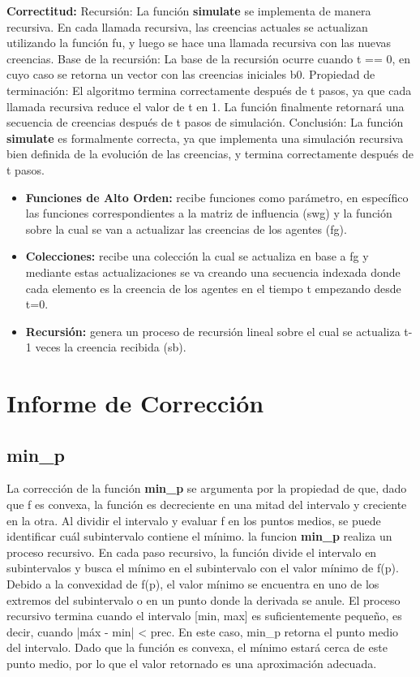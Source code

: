 \documentclass{article}
\begin{document}
    \textbf{Correctitud:}
    Recursión: La función \textbf{simulate} se implementa de manera recursiva. En cada llamada recursiva, las creencias actuales se actualizan utilizando la función fu, y luego se hace una llamada recursiva con las nuevas creencias.
    Base de la recursión: La base de la recursión ocurre cuando t == 0, en cuyo caso se retorna un vector con las creencias iniciales b0.
    Propiedad de terminación: El algoritmo termina correctamente después de t pasos, ya que cada llamada recursiva reduce el valor de t en 1. La función finalmente retornará una secuencia de creencias después de t pasos de simulación.
    Conclusión: La función \textbf{simulate} es formalmente correcta, ya que implementa una simulación recursiva bien definida de la evolución de las creencias, y termina correctamente después de t pasos.

    \begin{itemize}
      \item \textbf{Funciones de Alto Orden:} recibe funciones como parámetro, en específico las funciones correspondientes a la matriz de influencia (swg) y la función sobre la cual se van a actualizar las creencias de los agentes (fg).
      \item \textbf{Colecciones:} recibe una colección la cual se actualiza en base a fg y mediante estas actualizaciones se va creando una secuencia indexada donde cada elemento es la creencia de los agentes en el tiempo t empezando desde t=0.
      \item \textbf{Recursión:} genera un proceso de recursión lineal sobre el cual se actualiza t-1 veces la creencia recibida (sb).
    \end{itemize}

  \section{Informe de Corrección}

    \subsection{min\_p}
    La corrección de la función \textbf{min\_p} se argumenta por la propiedad de que, dado que f es convexa, la función es decreciente en una mitad del intervalo y creciente en la otra. Al dividir el intervalo y evaluar f en los puntos medios, se puede identificar cuál subintervalo contiene el mínimo.
    la funcion \textbf{min\_p} realiza un proceso recursivo. En cada paso recursivo, la función divide el intervalo en subintervalos y busca el mínimo en el subintervalo con el valor mínimo de f(p). Debido a la convexidad de f(p), el valor mínimo se encuentra en uno de los extremos del subintervalo o en un punto donde la derivada se anule.
    El proceso recursivo termina cuando el intervalo [min, max] es suficientemente pequeño, es decir, cuando |máx - min| < prec. En este caso, min_p retorna el punto medio del intervalo. Dado que la función es convexa, el mínimo estará cerca de este punto medio, por lo que el valor retornado es una aproximación adecuada.
\end{document}
